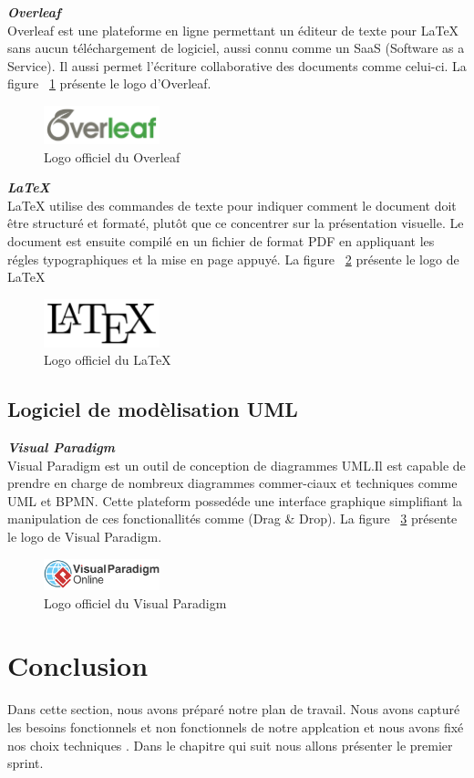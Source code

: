 \noindent
{\small\textbf{\textit{Overleaf}}}\mbox{}\\
Overleaf est une plateforme en ligne permettant un éditeur de texte pour LaTeX sans aucun téléchargement de logiciel, aussi connu comme un SaaS (Software as a Service). Il aussi permet l'écriture collaborative des documents comme celui-ci.
La figure ~\ref{fig:overleaf} présente le logo d'Overleaf.
\begin{figure}[H]
\centering
\includegraphics[width=0.3\textwidth]{logos/overleaf.png}
\caption{Logo officiel du Overleaf}
\label{fig:overleaf}
\end{figure}

\noindent
{\small\textbf{\textit{LaTeX}}}\mbox{}\\
LaTeX utilise des commandes de texte pour indiquer comment le document doit être structuré et formaté, plutôt que ce concentrer sur la présentation visuelle. Le document est ensuite compilé en un fichier de format PDF en appliquant les régles typographiques et la mise en page appuyé. La figure ~\ref{fig:latex} présente le logo de LaTeX
\begin{figure}[H]
\centering
\includegraphics[width=0.3\textwidth]{logos/latex.png}
\caption{Logo officiel du LaTeX}
\label{fig:latex}
\end{figure}

\subsection{Logiciel de modèlisation UML}
\noindent
{\small\textbf{\textit{Visual Paradigm}}}\mbox{}\\
Visual Paradigm est un outil de conception de diagrammes UML.Il est capable de prendre en charge de nombreux diagrammes commer-ciaux et techniques comme UML et BPMN. Cette plateform possedéde une interface graphique simplifiant la manipulation de ces fonctionallités comme (Drag \& Drop). La figure ~\ref{fig:vp} présente le logo de Visual Paradigm.

\begin{figure}[H]
\centering
\includegraphics[width=0.3\textwidth]{logos/vp.png}
\caption{Logo officiel du Visual Paradigm}
\label{fig:vp}
\end{figure}


\section{Conclusion}
\noindent
Dans cette section, nous avons préparé notre plan de travail. Nous avons capturé les besoins fonctionnels et non fonctionnels de notre applcation et nous avons fixé nos choix techniques .
Dans le chapitre qui suit nous allons présenter le premier sprint. 